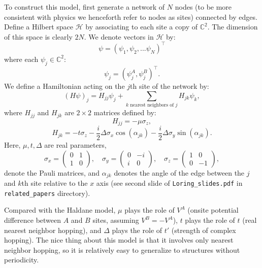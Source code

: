 \documentclass[a4paper]{article}
\begin{document}
To construct this model, first generate a network of $N$ nodes (to be more consistent with physics we henceforth refer to nodes as sites) connected by edges. Define a Hilbert space $\mathcal{H}$ by associating to each site a copy of $\mathbb{C}^2$. The dimension of this space is clearly $2 N$. We denote vectors in $\mathcal{H}$ by:
\begin{equation}
	\psi = \left( \psi_1, \psi_2, ... \psi_N \right)^\top
\end{equation}
where each $\psi_j \in \mathbb{C}^2$:
\begin{equation}
	\psi_j = \left( \psi_j^A , \psi_j^B \right)^\top.
\end{equation}
We define a Hamiltonian acting on the $j$th site of the network by:
\begin{equation}
	( H \psi )_j = H_{jj} \psi_j + \sum_{ k \text{ nearest neighbors of } j } H_{jk} \psi_k,
\end{equation}
where $H_{jj}$ and $H_{jk}$ are $2 \times 2$ matrices defined by:
\begin{equation}
	H_{jj} = - \mu \sigma_z,
\end{equation}
\begin{equation}
	H_{jk} = - t \sigma_z - \frac{ i }{ 2 } \Delta \sigma_x \cos( \alpha_{jk} ) - \frac{ i }{ 2 } \Delta \sigma_y \sin( \alpha_{jk} ).
\end{equation}
Here, $\mu, t, \Delta$ are real parameters,
\begin{equation}
	\sigma_x = \begin{pmatrix} 0 & 1 \\ 1 & 0 \end{pmatrix}, \quad \sigma_y = \begin{pmatrix} 0 & - i \\ i & 0 \end{pmatrix}, \quad \sigma_z = \begin{pmatrix} 1 & 0 \\ 0 & -1 \end{pmatrix},
\end{equation}
denote the Pauli matrices, and $\alpha_{jk}$ denotes the angle of the edge between the $j$ and $k$th site relative to the $x$ axis (see second slide of \verb|Loring_slides.pdf| in \verb|related_papers| directory).

Compared with the Haldane model, $\mu$ plays the role of $V^A$ (onsite potential difference between $A$ and $B$ sites, assuming $V^B = - V^A$), $t$ plays the role of $t$ (real nearest neighbor hopping), and $\Delta$ plays the role of $t'$ (strength of complex hopping). The nice thing about this model is that it involves only nearest neighbor hopping, so it is relatively easy to generalize to structures without periodicity.
\end{document}
